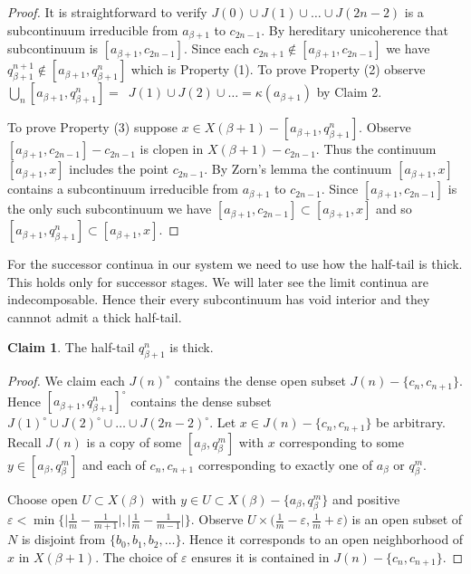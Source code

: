 \documentclass[12pt]{article}
\theoremstyle{plain}
\theoremstyle{definition}
\newcounter{claim5counter}
\newtheorem{claim5}[claim5counter]{Claim}
\newcommand{\K}{\ensuremath{\kappa}}
\newcommand{\B}{\ensuremath{\beta}}
\newcommand{\E}{\ensuremath{\varepsilon}}
\newcommand{\0}{\ensuremath{\varnothing}}
\begin{document}
	\begin{proof}
		
		It is straightforward to verify $J(0) \cup J(1) \cup \ldots \cup J(2n-2)$ is a subcontinuum irreducible from $a_{\B+1}$ to $c_{2n-1}$.
		By hereditary unicoherence that subcontinuum is $[a_{\B+1}, c_{2n-1}]$.
		Since each $c_{2n+1} \notin [a_{\B+1}, c_{2n-1}]$ we have $q^{n+1}_{\B+1} \notin [a_{\B+1}, q^n_{\B+1}]$ which is Property (1).
		To prove Property (2) observe \mbox{$\bigcup_n [a_{\B+1}, q^n_{\B+1}] = $ $J(1) \cup J(2) \cup \ldots = \K(a_{\B+1})$} by Claim 2.
		
		
		To prove Property (3) suppose $x \in X(\B+1) -  [a_{\B+1}, q^n_{\B+1}]$.
		Observe $[a_{\B+1}, c_{2n-1}] - c_{2n-1}$ is clopen in $X(\B+1) - c_{2n-1}$.
		Thus the continuum $[a_{\B+1},x]$ includes the point $c_{2n-1}$.
		By Zorn's lemma the continuum $[a_{\B+1},x]$ contains a subcontinuum irreducible from $a_{\B+1}$ to $c_{2n-1}$.
		Since $[a_{\B+1}, c_{2n-1}]$ is the only such subcontinuum 
		we have $[a_{\B+1}, c_{2n-1}] \subset [a_{\B+1},x]$ and so $ [a_{\B+1}, q^n_{\B+1}] \subset [a_{\B+1},x]$.
	\end{proof}
	
	For the successor continua in our system we need  to use how the half-tail is thick. This holds only for successor stages. We will later see the limit continua are indecomposable. Hence their every subcontinuum has void interior and they cannnot admit a thick half-tail.
	
	\begin{claim5}\label{thick}
		The half-tail $q^n_{\B+1}$ is thick. 
	\end{claim5}
	
	\begin{proof}
		We claim each $J(n)^\circ$ contains the dense open subset $J(n) - \{c_n,c_{n+1}\}$.
		Hence $[a_{\B+1}, q^n_{\B+1}] ^\circ$ contains the dense subset $J(1)^\circ \cup J(2)^\circ \cup \ldots \cup J(2n-2)^\circ$.
		Let $x \in J(n) - \{c_n,c_{n+1}\}$ be arbitrary.
		Recall $J(n)$ is a copy of some $[a_\B,q^m_\B]$ with $x$ corresponding to some $y \in [a_\B,q^m_\B]$
		and each of $c_n,c_{n+1}$ corresponding to exactly one of $a_\B$ or $q^m_\B$.
		
		Choose open $U \subset X(\B)$ with $y \in U \subset X(\B) - \{a_\B,q^m_\B\}$ 
		and positive $\displaystyle \E < \min \Big \{ \Big |\frac{1}{m} - \frac{1}{m+1} \Big |, \Big |\frac{1}{m} - \frac{1}{m-1} \Big | \Big \}$.  
		Observe $\displaystyle U \times \Big (\frac{1}{m}  - \E, \frac{1}{m}  + \E \Big )$ is an open subset of $N$ is disjoint from $\{b_0,b_1,b_2,\ldots\}$.
		Hence it corresponds to an open neighborhood of $x$ in $X(\B+1)$.
		The choice of $\E$ ensures it is contained in \mbox{$J(n) - \{c_n,c_{n+1}\}$}.
	\end{proof}
	
\end{document}
